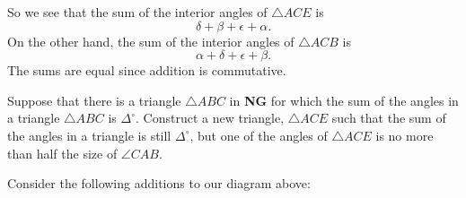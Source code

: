 \documentclass[handout]{ximera}
\begin{document}
\begin{question}
\begin{solution}
\begin{freeResponse}
\begin{image}
\end{image}
So we see that the sum of the interior angles of $\triangle ACE$ is
\[
\delta+\beta+\epsilon+\alpha.
\]
On the other hand, the sum of the interior angles of $\triangle ACB$ is 
\[
\alpha+\delta+\epsilon+\beta.
\]
The sums are equal since addition is commutative. 
\end{freeResponse}
\end{solution}
\end{question}

\begin{question}\label{22} 
Suppose that there is a triangle $\triangle ABC$ in \textbf{NG} for
which the sum of the angles in a triangle $\triangle ABC$ is
$\Delta^\circ$. Construct a new triangle, $\triangle ACE$ such that
the sum of the angles in a triangle is still $\Delta^\circ$, but one
of the angles of $\triangle ACE$ is no more than half the size of
$\angle CAB$.
\begin{image}
\end{image}


\begin{solution}
\begin{hint} Consider the following additions to our diagram above:
\begin{image}
\end{image}
\end{hint}
\end{solution}
\end{question}
\end{document}
